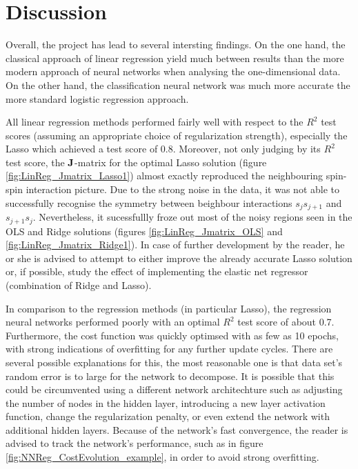 \documentclass[nofootinbib,reprint,english]{revtex4-1}
\begin{document}
\section{Discussion}
Overall, the project has lead to several intersting findings. On the one hand, the classical approach of linear regression yield much between results than the more modern approach of neural networks when analysing the one-dimensional data. On the other hand, the classification neural network was much more accurate the more standard logistic regression approach.

All linear regression methods performed fairly well with respect to the \(R^2\) test scores (assuming an appropriate choice of regularization strength), especially the Lasso which achieved a test score of 0.8. Moreover, not only judging by its \(R^2\) test score, the \(\vb{J}\)-matrix for the optimal Lasso solution (figure \ref{fig:LinReg_Jmatrix_Lasso1}) almost exactly reproduced the neighbouring spin-spin interaction picture. Due to the strong noise in the data, it was not able to successfully recognise the symmetry between beighbour interactions \(s_js_{j+1}\) and \(s_{j+1}s_j\). Nevertheless, it sucessfullly froze out most of the noisy regions seen in the OLS and Ridge solutions (figures \ref{fig:LinReg_Jmatrix_OLS} and \ref{fig:LinReg_Jmatrix_Ridge1}). In case of further development by the reader, he or she is advised to attempt to either improve the already accurate Lasso solution or, if possible, study the effect of implementing the elastic net regressor (combination of Ridge and Lasso).

In comparison to the regression methods (in particular Lasso), the regression neural networks performed poorly with an optimal \(R^2\) test score of about 0.7. Furthermore, the cost function  was quickly optimsed with as few as 10 epochs, with strong indications of overfitting for any further update cycles. There are several possible explanations for this, the most reasonable one is that data set's random error is to large for the network to decompose. It is possible that this could be circumvented using a different network architechture such as adjusting the number of nodes in the hidden layer, introducing a new layer activation function, change the regularization penalty, or even extend the network with additional hidden layers. Because of the network's fast convergence, the reader is advised to track the network's performance, such as in figure \ref{fig:NNReg_CostEvolution_example}, in order to avoid strong overfitting.
\end{document}
